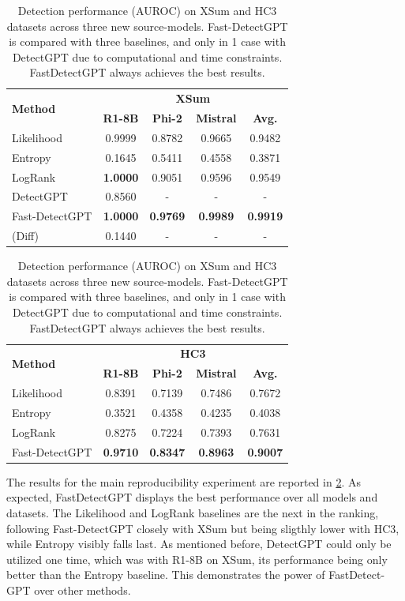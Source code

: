 \documentclass[11pt]{article}
\begin{document}
\begin{table}[h]
    \centering
    \small
    \begin{tabular}{l|ccc|c}
    \toprule
    \multirow{2}{*}{\textbf{Method}} & \multicolumn{4}{c}{\textbf{XSum}} \\
    \cmidrule{2-5}
    & \textbf{R1-8B} & \textbf{Phi-2} & \textbf{Mistral} & \textbf{Avg.} \\
    \midrule
    Likelihood & 0.9999 & 0.8782 & 0.9665 & 0.9482 \\
    Entropy & 0.1645 & 0.5411 & 0.4558 &  0.3871\\
    LogRank & \textbf{1.0000} & 0.9051 & 0.9596 & 0.9549 \\
    \midrule
    DetectGPT & 0.8560 & - & - & - \\
    Fast-DetectGPT & \textbf{1.0000} & \textbf{0.9769} & \textbf{0.9989} & \textbf{0.9919} \\
    (Diff) & 0.1440 & - & - & - \\
    \bottomrule
    \end{tabular}
    \vspace{0.5em}
    
    \begin{tabular}{l|ccc|c}
    \toprule
    \multirow{2}{*}{\textbf{Method}} & \multicolumn{4}{c}{\textbf{HC3}} \\
    \cmidrule{2-5}
    & \textbf{R1-8B} & \textbf{Phi-2} & \textbf{Mistral} & \textbf{Avg.} \\
    \midrule
    Likelihood & 0.8391 & 0.7139 & 0.7486 & 0.7672 \\
    Entropy & 0.3521 & 0.4358 & 0.4235 & 0.4038 \\
    LogRank & 0.8275 & 0.7224 & 0.7393 & 0.7631 \\
    \midrule
    Fast-DetectGPT & \textbf{0.9710} & \textbf{0.8347} & \textbf{0.8963} & \textbf{0.9007} \\
    \bottomrule
    \end{tabular}
    \vspace{0.5em}
    \caption{Detection performance (AUROC) on XSum and HC3 datasets across three new source-models. Fast-DetectGPT is compared with three baselines, and only in 1 case with DetectGPT due to computational and time constraints. FastDetectGPT always achieves the best results.}
    \label{tab:main_results}
\end{table}

The results for the main reproducibility experiment are reported in \cref{tab:main_results}. As expected, FastDetectGPT displays the best performance over all models and datasets. The Likelihood and LogRank baselines are the next in the ranking, following Fast-DetectGPT closely with XSum but being sligthly lower with HC3, while Entropy visibly falls last. As mentioned before, DetectGPT could only be utilized one time, which was with R1-8B on XSum, its performance being only better than the Entropy baseline. This demonstrates the power of FastDetect-GPT over other methods.
\end{document}
